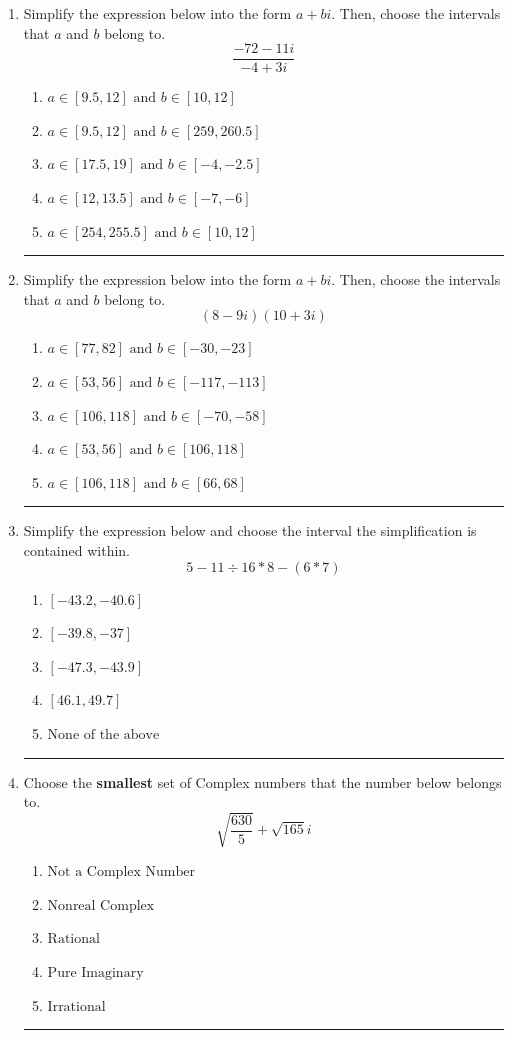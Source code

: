\documentclass[14pt]{extbook}
\newcommand{\litem}[1]{\item#1\hspace*{-1cm}\rule{\textwidth}{0.4pt}}
\begin{document}
\begin{enumerate}
\litem{
Simplify the expression below into the form $a+bi$. Then, choose the intervals that $a$ and $b$ belong to.\[ \frac{-72 - 11 i}{-4 + 3 i} \]\begin{enumerate}[label=\Alph*.]
\item \( a \in [9.5, 12] \text{ and } b \in [10, 12] \)
\item \( a \in [9.5, 12] \text{ and } b \in [259, 260.5] \)
\item \( a \in [17.5, 19] \text{ and } b \in [-4, -2.5] \)
\item \( a \in [12, 13.5] \text{ and } b \in [-7, -6] \)
\item \( a \in [254, 255.5] \text{ and } b \in [10, 12] \)

\end{enumerate} }
\litem{
Simplify the expression below into the form $a+bi$. Then, choose the intervals that $a$ and $b$ belong to.\[ (8 - 9 i)(10 + 3 i) \]\begin{enumerate}[label=\Alph*.]
\item \( a \in [77, 82] \text{ and } b \in [-30, -23] \)
\item \( a \in [53, 56] \text{ and } b \in [-117, -113] \)
\item \( a \in [106, 118] \text{ and } b \in [-70, -58] \)
\item \( a \in [53, 56] \text{ and } b \in [106, 118] \)
\item \( a \in [106, 118] \text{ and } b \in [66, 68] \)

\end{enumerate} }
\litem{
Simplify the expression below and choose the interval the simplification is contained within.\[ 5 - 11 \div 16 * 8 - (6 * 7) \]\begin{enumerate}[label=\Alph*.]
\item \( [-43.2, -40.6] \)
\item \( [-39.8, -37] \)
\item \( [-47.3, -43.9] \)
\item \( [46.1, 49.7] \)
\item \( \text{None of the above} \)

\end{enumerate} }
\litem{
Choose the \textbf{smallest} set of Complex numbers that the number below belongs to.\[ \sqrt{\frac{630}{5}}+\sqrt{165} i \]\begin{enumerate}[label=\Alph*.]
\item \( \text{Not a Complex Number} \)
\item \( \text{Nonreal Complex} \)
\item \( \text{Rational} \)
\item \( \text{Pure Imaginary} \)
\item \( \text{Irrational} \)


\end{enumerate}}
\end{enumerate}
\end{document}

